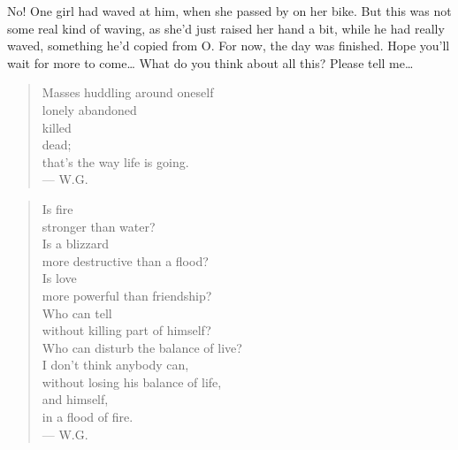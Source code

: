 No! One girl had waved at him, when she passed by on her bike. But this was not some real kind of waving, as she'd just raised her hand a bit, while he had really waved, something he'd copied from O. 
For now, the day was finished. 
Hope you'll wait for more to come\dots{}
What do you think about all this? Please tell me\dots{}

\begin{quote}
Masses huddling around oneself\\
\hspace*{5ex} lonely \hspace*{5ex} abandoned \\
\hspace*{10ex} killed \\
\hspace*{10ex} dead; \\
that's the way life is going. \\
--- W.G.
\end{quote}

\begin{quote}
Is fire \\
stronger than water? \\
Is a blizzard \\
more destructive than a flood? \\
Is love \\
more powerful than friendship? \\
Who can tell \\
without killing part of himself? \\
Who can disturb the balance of live? \\
I don't think anybody can, \\
without losing his balance of life, \\
and himself, \\
in a flood of fire. \\
--- W.G.
\end{quote}
